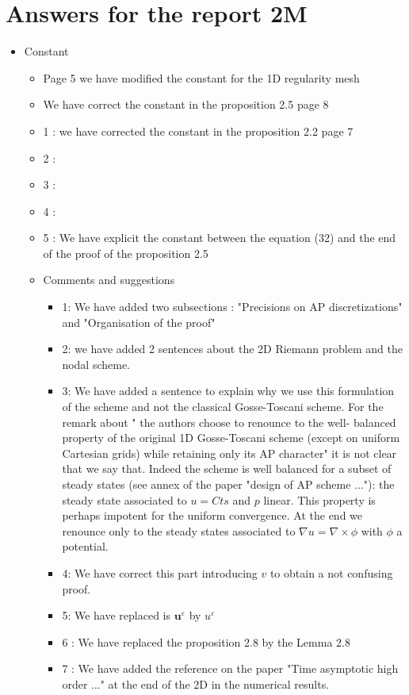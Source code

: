 \documentclass[a4paper,french,english,10pt]{article}
\newcommand{\eps}{\varepsilon}
\begin{document}
\section{Answers for the report 2M}
\begin{itemize}
\item Constant
\begin{itemize}
\item Page 5 we have modified the constant for the 1D regularity mesh
\item We have correct the constant in the proposition 2.5 page 8
\item 1 : we have corrected the constant in the proposition 2.2 page 7
\item 2 :
\item 3 :
\item 4 :
\item 5 : We have explicit the constant between the equation (32) and the end of the proof of the proposition 2.5
\end{itemize}
\begin{itemize}
\item Comments and suggestions
\begin{itemize}
\item 1: We have added two subsections : "Precisions on AP discretizations" and "Organisation of the proof"
\item 2: we have added 2 sentences about the 2D Riemann problem and the nodal scheme. 
\item 3: We have added a sentence to explain why we use this formulation of the scheme and not the classical Gosse-Toscani scheme. For the remark about " the authors choose to renounce to the well- balanced property of the original 1D Gosse-Toscani scheme (except on uniform Cartesian grids) while retaining only its AP character" it is not clear that we say that. Indeed the scheme is well balanced for a subset of steady states (see annex of the paper "design of AP scheme ..."): the steady state associated to $u=Cts$ and $p$ linear. This property is perhaps impotent for the uniform convergence. At the end we renounce only to the steady states associated to $\nabla{u}=\nabla\times \phi$ with $\phi$ a potential. 
\item 4: We have correct this part introducing $v$ to obtain a not confusing proof.
\item 5: We have replaced is $\mathbf{u}^{\eps}$ by $u^{\eps}$
\item 6 : We have replaced the proposition 2.8 by the Lemma 2.8
\item 7 : We have added the reference on the paper "Time asymptotic high order ..." at the end of the 2D in the numerical results.

\end{itemize}
\end{itemize}
\end{itemize}
\end{document}
